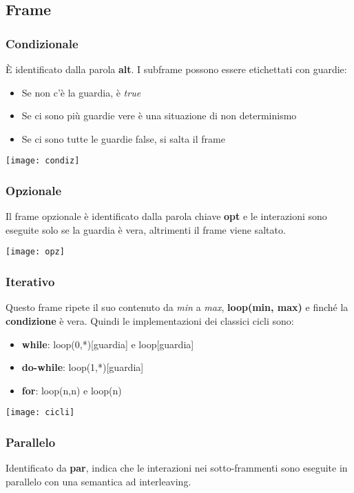 \subsection{Frame}
\subsubsection{Condizionale}
È identificato dalla parola \textbf{alt}. I subframe possono essere etichettati con guardie:
\begin{itemize}
	\item Se non c'è la guardia, è \textit{true}
	\item Se ci sono più guardie vere è una situazione di non determinismo
	\item Se ci sono tutte le guardie false, si salta il frame
\end{itemize}
\begin{center}
	\texttt{[image: condiz]}
\end{center}

\subsubsection{Opzionale}
Il frame opzionale è identificato dalla parola chiave \textbf{opt} e le interazioni sono eseguite solo se la guardia è vera, altrimenti il frame viene saltato.
\begin{center}
	\texttt{[image: opz]}
\end{center}

\subsubsection{Iterativo}
Questo frame ripete il suo contenuto da \textit{min} a \textit{max}, \textbf{loop(min, max)} e finché la \textbf{condizione} è vera. Quindi le implementazioni dei classici cicli sono:
\begin{itemize}
	\item \textbf{while}: loop(0,*)[guardia] e loop[guardia]
	\item \textbf{do-while}: loop(1,*)[guardia]
	\item \textbf{for}: loop(n,n) e loop(n)
\end{itemize}
\begin{center}
	\texttt{[image: cicli]}
\end{center}

\subsubsection{Parallelo}
Identificato da \textbf{par}, indica che le interazioni nei sotto-frammenti sono eseguite in parallelo con una semantica ad interleaving.


